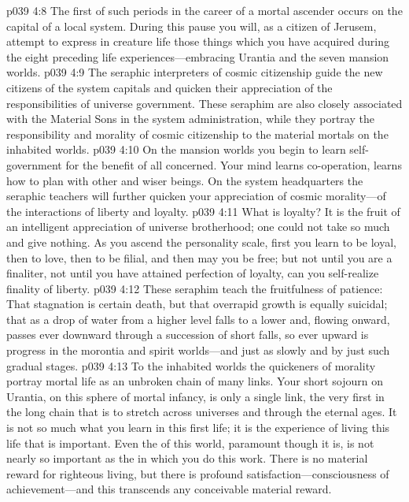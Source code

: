 \vs p039 4:8 The first of such periods in the career of a mortal ascender occurs on the capital of a local system. During this pause you will, as a citizen of Jerusem, attempt to express in creature life those things which you have acquired during the eight preceding life experiences---embracing Urantia and the seven mansion worlds.
\vs p039 4:9 The seraphic interpreters of cosmic citizenship guide the new citizens of the system capitals and quicken their appreciation of the responsibilities of universe government. These seraphim are also closely associated with the Material Sons in the system administration, while they portray the responsibility and morality of cosmic citizenship to the material mortals on the inhabited worlds.
\pc \vs p039 4:10 \bibnobreakspace {} On the mansion worlds you begin to learn self\hyp{}government for the benefit of all concerned. Your mind learns co\hyp{}operation, learns how to plan with other and wiser beings. On the system headquarters the seraphic teachers will further quicken your appreciation of cosmic morality---of the interactions of liberty and loyalty.
\vs p039 4:11 What is loyalty? It is the fruit of an intelligent appreciation of universe brotherhood; one could not take so much and give nothing. As you ascend the personality scale, first you learn to be loyal, then to love, then to be filial, and then may you be free; but not until you are a finaliter, not until you have attained perfection of loyalty, can you self\hyp{}realize finality of liberty.
\pc \vs p039 4:12 These seraphim teach the fruitfulness of patience: That stagnation is certain death, but that overrapid growth is equally suicidal; that as a drop of water from a higher level falls to a lower and, flowing onward, passes ever downward through a succession of short falls, so ever upward is progress in the morontia and spirit worlds---and just as slowly and by just such gradual stages.
\vs p039 4:13 To the inhabited worlds the quickeners of morality portray mortal life as an unbroken chain of many links. Your short sojourn on Urantia, on this sphere of mortal infancy, is only a single link, the very first in the long chain that is to stretch across universes and through the eternal ages. It is not so much what you learn in this first life; it is the experience of living this life that is important. Even the  of this world, paramount though it is, is not nearly so important as the  in which you do this work. There is no material reward for righteous living, but there is profound satisfaction---consciousness of achievement---and this transcends any conceivable material reward.
